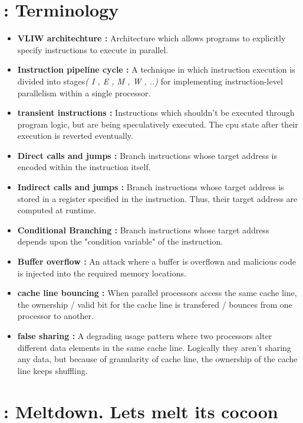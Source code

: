 \documentclass[12pt]{article}
\begin{document}
\begin{appendices}
	\section{: Terminology}
	\begin{itemize}
		\item \textbf{VLIW architechture : } Architecture which allows programs to explicitly specify instructions to execute in parallel. 
		\item \textbf{Instruction pipeline cycle : }  A technique in which instruction execution is divided into stages\textit{( I , E , M , W , ..)} for implementing instruction-level parallelism within a single processor. 
		\item \textbf{transient instructions : } Instructions which shouldn't be executed through program logic, but are being speculatively executed. The cpu state after their execution is reverted eventually.  
		\item \textbf{Direct calls and jumps : } Branch instructions whose target address is encoded within the instruction itself.
		\item \textbf{Indirect calls and jumps : } Branch instructions whose target address is stored in a register specified in the instruction. Thus, their target address are computed at runtime.
		\item \textbf{Conditional Branching : } Branch instructions whose target address depends upon the "condition variable" of the instruction.
		\item \textbf{Buffer overflow : }  An attack where a buffer is overflown and malicious code is injected into the required memory locations.
		\item \textbf{cache line bouncing : } When parallel processors access the same cache line, the ownership / valid bit for the cache line is transfered / bounces from one processor to another.
		\item \textbf{false sharing : }	 A degrading usage pattern where two processors alter different data elements in the same cache line. Logically they aren't sharing any data, but because of granularity of cache line, the ownership of the cache line keeps shuffling.
	\end{itemize}
	\newpage
	\section{: Meltdown. Lets melt its cocoon}
	

\end{appendices}
\end{document}
